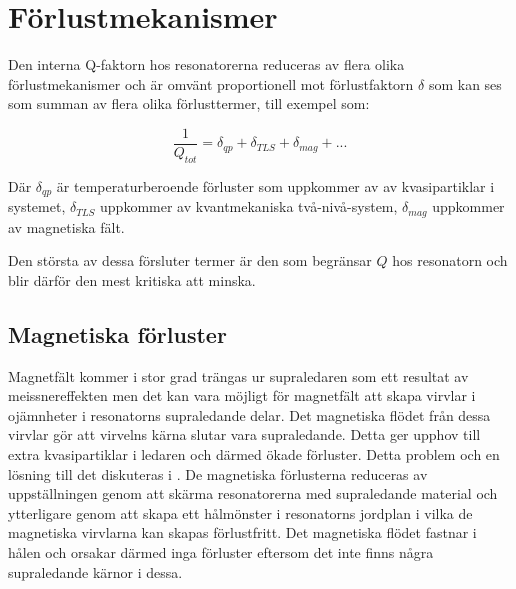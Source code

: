 \documentclass[main.tex]{subfiles}
\begin{document}

\section{Förlustmekanismer}
\label{sec:losses}
Den interna Q-faktorn hos resonatorerna reduceras av flera olika förlustmekanismer och är omvänt proportionell mot förlustfaktorn $\delta$ som kan ses som summan av flera olika förlusttermer\cite{Boehme2016,Goetz2016}, till exempel som:

\begin{equation}
    \label{ekv:Qtot}
    \frac{1}{Q_{tot}}=\delta_{qp}+\delta_{TLS}+\delta_{mag}+...
\end{equation}
\noindent

Där $\delta_{qp}$ är temperaturberoende förluster som uppkommer av av kvasipartiklar i systemet, $\delta_{TLS}$ uppkommer av kvantmekaniska två-nivå-system, $\delta_{mag}$ uppkommer av magnetiska fält. 

Den största av dessa försluter termer är den som begränsar $Q$ hos resonatorn och blir därför den mest kritiska att minska.

\subsection{Magnetiska förluster}
\label{sek:mag}
Magnetfält kommer i stor grad trängas ur supraledaren som ett resultat av meissnereffekten men det kan vara möjligt för magnetfält att skapa virvlar i ojämnheter i resonatorns supraledande delar. Det magnetiska flödet från dessa virvlar gör att virvelns kärna slutar vara supraledande. Detta ger upphov till extra kvasipartiklar i ledaren och därmed ökade förluster. Detta problem och en lösning till det diskuteras i \cite{Chiaro2016}. De magnetiska förlusterna reduceras av uppställningen genom att skärma resonatorerna med supraledande material och ytterligare genom att skapa ett hålmönster i resonatorns jordplan i vilka de magnetiska virvlarna kan skapas förlustfritt\cite{Chiaro2016}. Det magnetiska flödet fastnar i hålen och orsakar därmed inga förluster\cite{Chiaro2016} eftersom det inte finns några supraledande kärnor i dessa.
\end{document}
